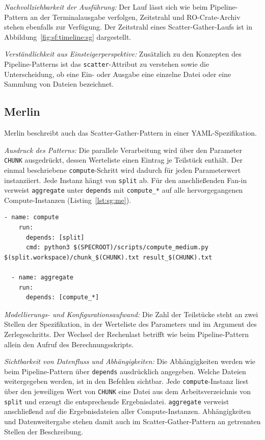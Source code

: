 \emph{Nachvollziehbarkeit der Ausführung:} Der Lauf lässt sich wie
beim Pipeline-Pattern an der Terminalausgabe verfolgen, Zeitstrahl
und RO-Crate-Archiv stehen ebenfalls zur Verfügung. Der Zeitstrahl
eines Scatter-Gather-Laufs ist in
Abbildung~\ref{fig:sf:timeline:sg} dargestellt.

\emph{Verständlichkeit aus Einsteigerperspektive:} Zusätzlich zu den
Konzepten des Pipeline-Patterns ist das \texttt{scatter}-Attribut zu
verstehen sowie die Unterscheidung, ob eine Ein- oder Ausgabe eine
einzelne Datei oder eine Sammlung von Dateien bezeichnet.

\subsection{Merlin}
\label{sec:lokal:sg:merlin}

Merlin beschreibt auch das Scatter-Gather-Pattern in einer
YAML-Spezifikation.

\emph{Ausdruck des Patterns:} Die parallele Verarbeitung wird über
den Parameter \texttt{CHUNK} ausgedrückt, dessen Werteliste einen
Eintrag je Teilstück enthält. Der einmal beschriebene
\texttt{compute}-Schritt wird dadurch für jeden Parameterwert
instanziiert. Jede Instanz hängt von \texttt{split} ab. Für den
anschließenden Fan-in verweist \texttt{aggregate} unter
\texttt{depends} mit \texttt{compute\_*} auf alle hervorgegangenen Compute-Instanzen (Listing~\ref{lst:sg:me}).

\begin{lstlisting}[caption={Parametrisierter Verarbeitungsschritt und Fan-in (Merlin, Scatter-Gather)},label={lst:sg:me}]
  - name: compute
    run:
      depends: [split]
      cmd: python3 $(SPECROOT)/scripts/compute_medium.py $(split.workspace)/chunk_$(CHUNK).txt result_$(CHUNK).txt

  - name: aggregate
    run:
      depends: [compute_*]
\end{lstlisting}

\emph{Modellierungs- und Konfigurationsaufwand:} Die Zahl der
Teilstücke steht an zwei Stellen der Spezifikation, in der
Werteliste des Parameters und im Argument des Zerlegeschritts. Der
Wechsel der Rechenlast betrifft wie beim Pipeline-Pattern allein den
Aufruf des Berechnungsskripts.

\emph{Sichtbarkeit von Datenfluss und Abhängigkeiten:} Die
Abhängigkeiten werden wie beim Pipeline-Pattern über
\texttt{depends} ausdrücklich angegeben. Welche Dateien
weitergegeben werden, ist in den Befehlen sichtbar. Jede
\texttt{compute}-Instanz liest über den jeweiligen Wert von
\texttt{CHUNK} eine Datei aus dem Arbeitsverzeichnis von
\texttt{split} und erzeugt die entsprechende Ergebnisdatei.
\texttt{aggregate} verweist anschließend auf die Ergebnisdateien
aller Compute-Instanzen. Abhängigkeiten und Datenweitergabe stehen
damit auch im Scatter-Gather-Pattern an getrennten Stellen der
Beschreibung.

